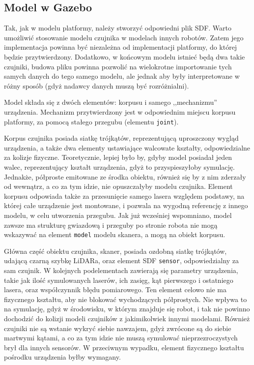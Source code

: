 	\subsection{Model w Gazebo}
		Tak, jak w modelu platformy, należy stworzyć odpowiedni plik SDF. 
		Warto umożliwić stosowanie modelu czujnika w modelach innych robotów. 
		Zatem jego implementacja powinna być niezależna od implementacji platformy, do której będzie przytwierdzony.
		Dodatkowo, w końcowym modelu istnieć będą dwa takie czujniki, budowa pliku powinna pozwolić na wielokrotne importowanie tych samych danych do tego samego modelu, 
		ale jednak aby były interpretowane w różny sposób (gdyż nadawcy danych muszą być rozróżnialni).

		Model składa się z dwóch elementów: korpusu i samego ,,mechanizmu'' urządzenia.
		Mechanizm przytwierdzony jest w odpowiednim miejscu korpusu platformy, za pomocą stałego przegubu (elementu \texttt{joint}).

		Korpus czujnika posiada siatkę trójkątów, reprezentującą uproszczony wygląd urządzenia, a także dwa elementy ustawiające walcowate kształty, odpowiedzialne za kolizje fizyczne.
		Teoretycznie, lepiej było by, gdyby model posiadał jeden walec, reprezentujący kształt urządzenia, gdyż to przyspieszyłoby symulację. 
		Jednakże, półproste emitowane ze środka obiektu, również się by z nim zderzały od wewnątrz, a co za tym idzie, nie opuszczałyby modelu czujnika.
		Element korpusu odpowiada także za przesunięcie samego lasera względem podstawy, na której całe urządzenie jest montowane, i 
		pozwala na wygodną referencję z innego modelu, w celu utworzenia przegubu.
		Jak już wcześniej wspomniano, model zawsze ma strukturę gwiazdową i przeguby po stronie robota nie mogą wskazywać na element \texttt{model} modelu skanera, a mogą
		na obiekt korpusu.

		Główna część obiektu czujnika, skaner, posiada ozdobną siatkę trójkątów, udającą czarną szybkę LiDARa, oraz element SDF \texttt{sensor}, odpowiedzialny za sam czujnik.
		W kolejnych podelementach zawierają się parametry urządzenia, takie jak ilość symulowanych laserów, ich zasięg, kąt pierwszego i ostatniego lasera, oraz współczynnik błędu pomiarowego. Ten element celowo nie ma fizycznego kształtu, aby nie blokować wychodzących półprostych. 
		Nie wpływa to na symulację, gdyż w środowisku, w którym znajduje się robot, i tak nie powinno dochodzić do kolizji modeli czujników z jakimikolwiek innymi modelami.
		Również czujniki nie są wstanie wykryć siebie nawzajem, gdyż zwrócone są do siebie martwymi kątami, a co za tym idzie nie muszą symulować nieprzezroczystych brył dla
		innych sensorów.
		W przeciwnym wypadku, element fizycznego kształtu pośrodku urządzenia byłby wymagany.

